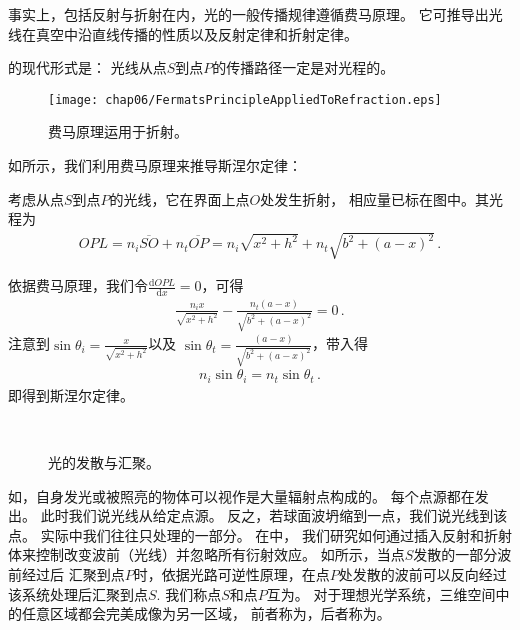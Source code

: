 事实上，包括反射与折射在内，光的一般传播规律遵循费马原理。
它可推导出光线在真空中沿直线传播的性质以及反射定律和折射定律。
\begin{proposition}
    的现代形式是：
    光线从点$S$到点$P$的传播路径一定是对光程的。
\end{proposition}

\begin{figure}[htbp]
    \centering\texttt{[image: chap06/FermatsPrincipleAppliedToRefraction.eps]}
    \caption{费马原理运用于折射。}
    \label{fig:6.28}
\end{figure}

如所示，我们利用费马原理来推导斯涅尔定律：
\begin{prove}
    考虑从点$S$到点$P$的光线，它在界面上点$O$处发生折射，
    相应量已标在图中。其光程为
    \begin{align}
        OPL=n_i\overline{SO}+n_t\overline{OP}=n_i\sqrt{x^2+h^2}+n_t\sqrt{b^2+(a-x)^2}\, .
    \end{align}

    依据费马原理，我们令$\displaystyle\frac{\mathrm{d}OPL}{\mathrm{d}x}=0$，可得
    \begin{align}
        \frac{n_ix}{\sqrt{x^2+h^2}}-\frac{n_t(a-x)}{\sqrt{b^2+(a-x)^2}}=0\, .
    \end{align}
    注意到$\displaystyle\sin\theta_i=\frac{x}{\sqrt{x^2+h^2}}$以及
    $\displaystyle\sin\theta_t=\frac{(a-x)}{\sqrt{b^2+(a-x)^2}}$，带入得
    \begin{align}
        n_i\sin\theta_i=n_t\sin\theta_t\, .
    \end{align}
    即得到斯涅尔定律。
\end{prove}

\begin{figure}[htbp]
    \centering
    \,
    \caption{光的发散与汇聚。}
    \label{fig:6.29}
\end{figure}

如，自身发光或被照亮的物体可以视作是大量辐射点构成的。
每个点源都在发出。
此时我们说光线从给定点源。
反之，若球面波坍缩到一点，我们说光线到该点。
实际中我们往往只处理的一部分。
在中，
我们研究如何通过插入反射和折射体来控制改变波前（光线）并忽略所有衍射效应。
如所示，当点$S$发散的一部分波前经过后
汇聚到点$P$时，依据光路可逆性原理，在点$P$处发散的波前可以反向经过该系统处理后汇聚到点$S$.
我们称点$S$和点$P$互为。
对于理想光学系统，三维空间中的任意区域都会完美成像为另一区域，
前者称为，后者称为。

